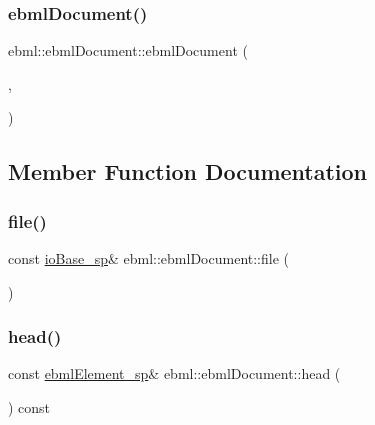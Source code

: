 \subsubsection{\texorpdfstring{ebml\+Document()}{ebmlDocument()}\hspace{0.1cm}{\footnotesize\ttfamily [3/3]}}
{\footnotesize\ttfamily ebml\+::ebml\+Document\+::ebml\+Document (\begin{DoxyParamCaption}\item[{const \mbox{\hyperlink{classebml_1_1ebmlSchema}{ebml\+Schema}} $\ast$}]{,  }\item[{\mbox{\hyperlink{namespaceebml_a7bb59128ac6af27e47367938a846b569}{io\+Base\+\_\+sp}} \&\&}]{ }\end{DoxyParamCaption})\hspace{0.3cm}{\ttfamily [protected]}}



\subsection{Member Function Documentation}
\mbox{\label{classebml_1_1ebmlDocument_ab95de6cd5be1fbeefb5a50cc001c42cc}} 
\subsubsection{\texorpdfstring{file()}{file()}}
{\footnotesize\ttfamily const \mbox{\hyperlink{namespaceebml_a7bb59128ac6af27e47367938a846b569}{io\+Base\+\_\+sp}}\& ebml\+::ebml\+Document\+::file (\begin{DoxyParamCaption}{ }\end{DoxyParamCaption})}

\mbox{\label{classebml_1_1ebmlDocument_addbc9eaabb0d2a608b6a19e4f7b5e17b}} 
\subsubsection{\texorpdfstring{head()}{head()}}
{\footnotesize\ttfamily const \mbox{\hyperlink{namespaceebml_adad533b7705a16bb360fe56380c5e7be}{ebml\+Element\+\_\+sp}}\& ebml\+::ebml\+Document\+::head (\begin{DoxyParamCaption}{ }\end{DoxyParamCaption}) const}

